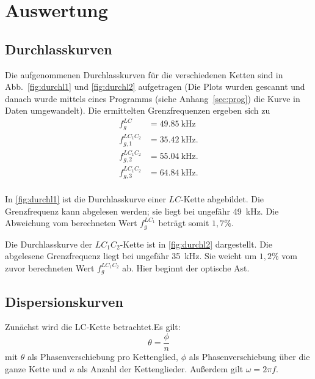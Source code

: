 \section{Auswertung}
\label{sec:Auswertung}

\subsection{Durchlasskurven}
Die aufgenommenen Durchlasskurven für die verschiedenen Ketten sind in Abb.~\ref{fig:durchl1} und \ref{fig:durchl2} aufgetragen (Die Plots wurden gescannt und danach wurde mittels eines Programms (siehe Anhang~\ref{sec:prog}) die Kurve in Daten umgewandelt). Die ermittelten Grenzfrequenzen ergeben sich zu
\begin{align}
  f_g^{LC} &= \SI{49,85}{\kilo\hertz} \\
  f_{g,1}^{LC_1C_2} &= \SI{35,42}{\kilo\hertz}. \\
  f_{g,2}^{LC_1C_2} &= \SI{55,04}{\kilo\hertz}. \\
  f_{g,3}^{LC_1C_2} &= \SI{64,84}{\kilo\hertz}. \\
\end{align}


In \ref{fig:durchl1} ist die Durchlasskurve einer $LC$-Kette abgebildet. Die Grenzfrequenz kann abgelesen werden; sie liegt bei ungefähr \SI{49}{\kilo\hertz}. Die Abweichung vom berechneten Wert $f_g^{LC_{1}}$ beträgt somit $1,7\%$.

Die Durchlasskurve der $LC_1C_2$-Kette ist in \ref{fig:durchl2} dargestellt. Die abgelesene Grenzfrequenz liegt bei ungefähr \SI{35}{\kilo\hertz}. Sie weicht um $1,2\%$ vom zuvor berechneten Wert $f_g^{LC_1C_2}$ ab. Hier beginnt der optische Ast.

\subsection{Dispersionskurven}
Zunächst wird die LC-Kette betrachtet.Es gilt:
\begin{equation}
  \theta = \frac{\phi}{n}
\end{equation}
mit $\theta$ als Phasenverschiebung pro Kettenglied, $\phi$ als Phasenverschiebung über die ganze Kette und $n$ als Anzahl der Kettenglieder.
Außerdem gilt $\omega = 2\pi f$.


